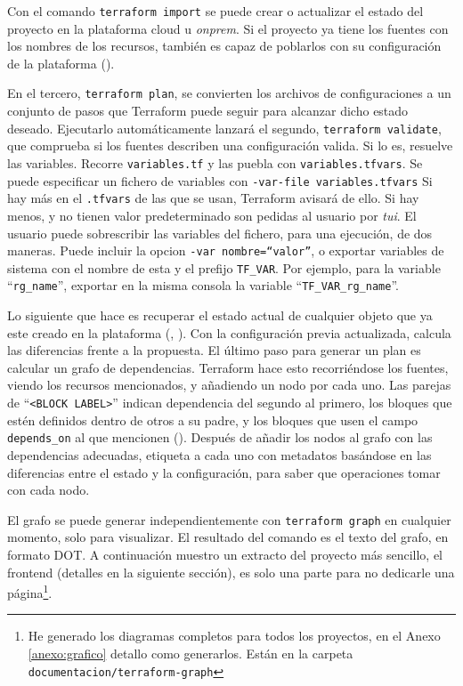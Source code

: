 \documentclass[11pt]{article}
\begin{document}
\begin{flushleft}
		Con el comando \texttt{terraform import} se puede crear o actualizar el estado del proyecto en la plataforma cloud u \textit{\gls{onprem}}. Si el proyecto ya tiene los fuentes con los nombres de los recursos, también es capaz de poblarlos con su configuración de la plataforma (\cite{hashicorp_import}).
		\linebreak
		
		En el tercero, \texttt{terraform plan}, se convierten los archivos de configuraciones a un conjunto de pasos que Terraform puede seguir para alcanzar dicho estado deseado. Ejecutarlo automáticamente lanzará el segundo, \texttt{terraform validate}, que comprueba si los fuentes describen una configuración valida. Si lo es, resuelve las variables. Recorre \texttt{variables.tf} y las puebla con \texttt{variables.tfvars}. Se puede especificar un fichero de variables con \texttt{-var-file variables.tfvars} Si hay más en el \texttt{.tfvars} de las que se usan, Terraform avisará de ello. Si hay menos, y no tienen valor predeterminado son pedidas al usuario por \textit{\acrshort{tui}}. El usuario puede sobrescribir las variables del fichero, para una ejecución, de dos maneras. Puede incluir la opcion \texttt{-var nombre=``valor''}, o exportar variables de sistema con el nombre de esta y el prefijo \texttt{TF\_VAR}. Por ejemplo, para la variable ``\texttt{rg\_name}'', exportar en la misma consola la variable ``\texttt{TF\_VAR\_rg\_name}''.
		\linebreak
		
		Lo siguiente que hace es recuperar el estado actual de cualquier objeto que ya este creado en la plataforma (\cite{hashicorp_plan}, \cite{hashicorp_plan_refresh}). Con la configuración previa actualizada, calcula las diferencias frente a la propuesta. El último paso para generar un plan es calcular un grafo de dependencias. Terraform hace esto recorriéndose los fuentes, viendo los recursos mencionados, y añadiendo un nodo por cada uno. Las parejas de ``\texttt{<BLOCK LABEL>}'' indican dependencia del segundo al primero, los bloques que estén definidos dentro de otros a su padre, y los bloques que usen el campo \texttt{depends\_on} al que mencionen (\cite{hashicorp_graph}). Después de añadir los nodos al grafo con las dependencias adecuadas, etiqueta a cada uno con metadatos basándose en las diferencias entre el estado y la configuración, para saber que operaciones tomar con cada nodo. 
		\linebreak
		
		El grafo se puede generar independientemente con \texttt{terraform graph} en cualquier momento, solo para visualizar. El resultado del comando es el texto del grafo, en formato DOT. A continuación muestro un extracto del proyecto más sencillo, el frontend (detalles en la siguiente sección), es solo una parte para no dedicarle una página\footnote{He generado los diagramas completos para todos los proyectos, en el Anexo \ref{anexo:grafico} detallo como generarlos. Están en la carpeta \texttt{documentacion/terraform-graph}}. 
		\linebreak
		

\end{flushleft}
\end{document}
